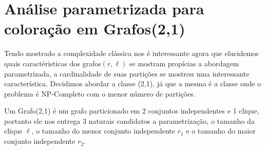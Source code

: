 \chapter{Análise parametrizada para coloração em Grafos(2,1)}
Tendo mostrado a complexidade clássica nos é interessante agora que elucidemos quais caractéristicas dos grafos$(r,\ell)$ se mostram propícias a abordagem parametrizada, a cardinalidade de suas partições se mostrou uma interessante característica.
Decidimos abordar a classe (2,1), já que a mesma é a classe onde o problema é NP-Completo com o menor número de partições.

Um Grafo(2,1) é um grafo particionado em 2 conjuntos independentes e 1 clique, portanto ele nos entrega 3 naturais candidatos a parametrização, o tamanho da clique $\ell$, o tamanho do menor conjunto independente $r_1$ e o tamanho do maior conjunto independente $r_2$.


